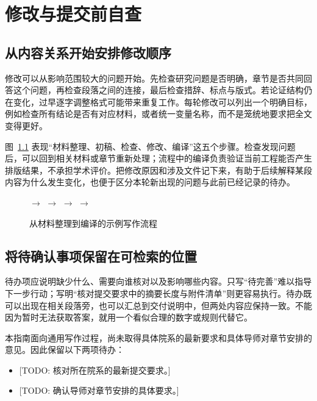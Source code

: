 \chapter{修改与提交前自查}
\label{chap:guide3}

\section{从内容关系开始安排修改顺序}

修改可以从影响范围较大的问题开始。先检查研究问题是否明确，章节是否共同回答这个问题，再检查段落之间的连接，最后检查措辞、标点与版式。若论证结构仍在变化，过早逐字调整格式可能带来重复工作。每轮修改可以列出一个明确目标，例如检查所有结论是否有对应材料，或者统一变量名称，而不是笼统地要求把全文变得更好。

图~\ref{fig:workflow} 表现“材料整理、初稿、检查、修改、编译”这五个步骤。检查发现问题后，可以回到相关材料或章节重新处理；流程中的编译负责验证当前工程能否产生排版结果，不承担学术评价。把修改原因和涉及文件记下来，有助于后续解释某段内容为什么发生变化，也便于区分本轮新出现的问题与此前已经记录的待办。

\begin{figure}[htbp]
\centering
{}\hfill
$\rightarrow$\hfill
{}\hfill
$\rightarrow$\hfill
{}\hfill
$\rightarrow$\hfill
{}\hfill
$\rightarrow$\hfill
{}
\caption{从材料整理到编译的示例写作流程}
\label{fig:workflow}
\end{figure}


\section{将待确认事项保留在可检索的位置}

待办项应说明缺少什么、需要向谁核对以及影响哪些内容。只写“待完善”难以指导下一步行动；写明“核对提交要求中的摘要长度与附件清单”则更容易执行。待办既可以出现在相关段落旁，也可以汇总到交付说明中，但两处内容应保持一致。不能因为暂时无法获取答案，就用一个看似合理的数字或规则代替它。

本指南面向通用写作过程，尚未取得具体院系的最新要求和具体导师对章节安排的意见。因此保留以下两项待办：

\begin{itemize}
\item {}[TODO: 核对所在院系的最新提交要求。]
\item {}[TODO: 确认导师对章节安排的具体要求。]
\end{itemize}


